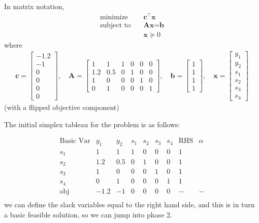 \documentclass[11pt]{article}
\begin{document}
In matrix notation,
\begin{align*}
  \text{minimize} & \quad \textbf{c}^\top \textbf{x} \\
  \text{subject to} & \quad \textbf{A} \textbf{x} = \textbf{b} \\
  & \quad \textbf{x} \succeq 0
\end{align*}
where
\begin{align*}
    \textbf{c} = 
  \begin{bmatrix}
     -1.2 \\ -1 \\ 0 \\ 0 \\ 0 \\ 0
  \end{bmatrix}, \quad
  \textbf{A} = 
  \begin{bmatrix}
    1 & 1 & 1 & 0 & 0 & 0 \\
    1.2 & 0.5 & 0 & 1 & 0 & 0 \\
    1 & 0 & 0 & 0 & 1 & 0 \\
    0 & 1 & 0 & 0 & 0 & 1
  \end{bmatrix}, \quad
  \textbf{b} = 
  \begin{bmatrix}
    1 \\ 1 \\ 1 \\ 1
  \end{bmatrix}, \quad
  \textbf{x} = 
  \begin{bmatrix}
    y_1 \\ y_2 \\ s_1 \\ s_2 \\ s_3 \\ s_4
  \end{bmatrix}
\end{align*}
(with a flipped objective component)

The initial simplex tableau for the problem is as follows:

\[
\begin{array}{c|cccccc|c|c}
\text{Basic Var} & y_1 & y_2 & s_1 & s_2 & s_3 & s_4 & \text{RHS} & \alpha \\
\hline
s_1 & 1 & 1 & 1 & 0 & 0 & 0 & 1 &  \\
s_2 & 1.2 & 0.5 & 0 & 1 & 0 & 0 & 1 &  \\
s_3 & 1 & 0 & 0 & 0 & 1 & 0 & 1 &  \\
s_4 & 0 & 1 & 0 & 0 & 0 & 1 & 1 &  \\
\hline
\text{obj} & -1.2 & -1 & 0 & 0 & 0 & 0 & - & - \\
\end{array}
\]
we can define the slack variables equal to the right hand side, and this is in turn a basic feasible solution, so we can jump into phase 2.
\end{document}
